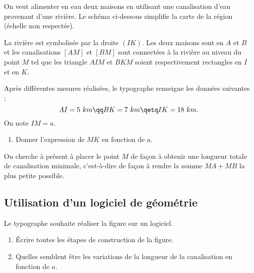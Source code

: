 \documentclass[10pt,french]{book}
\begin{document}

On veut alimenter en eau deux maisons en utilisant une canalisation d'eau provenant d'une rivière. Le schéma ci-dessous simplifie la carte de la région (échelle non respectée).\par
La rivière est symbolisée par la droite $(IK)$. Les deux maisons sont en $A$ et $B$ et les canalisations $[AM]$ et $[BM]$ sont connectées à la rivière au niveau du point $M$ tel que les triangle $AIM$ et $BKM$ soient respectivement rectangles en $I$ et en $K$.

\begin{center}
\end{center}

Après différentes mesures réalisées, le typographe renseigne les données suivantes :
\[AI = 5~km \qq BK = 7~km \qetq IK = 18~km.\]
On note $IM = a$.
\begin{enumerate}
    \item Donner l'expression de $MK$ en fonction de $a$.
\end{enumerate}

On cherche à présent à placer le point $M$ de façon à obtenir une longueur totale de canalisation minimale, c'est-à-dire de façon à rendre la somme $MA + MB$  la plus petite possible.

\subsection*{Utilisation d'un logiciel de géométrie}
Le typographe souhaite réaliser la figure sur un logiciel.
\begin{enumerate}[resume]
    \item \'Ecrire toutes les étapes de construction de la figure.
    \item Quelles semblent être les variations de la longueur de la canalisation en fonction de $a$.
\end{enumerate}
\end{document}
